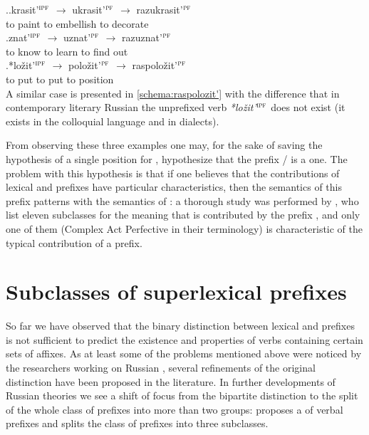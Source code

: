 \ex.\ag.\label{schema:razukrasit'}krasit'$^{\textsc{ipf}}$ {$\rightarrow$} ukrasit'$^{\textsc{pf}}$ {$\rightarrow$} razukrasit'$^{\textsc{pf}}$\\
{to paint} {} {to embellish} {} {to decorate}\\
\bg.\label{schema:razuznat'}znat'$^{\textsc{ipf}}$ {$\rightarrow$} uznat'$^{\textsc{pf}}$ {$\rightarrow$} razuznat'$^{\textsc{pf}}$\\
{to know} {} {to learn} {} {to find out}\\
\bg.*lo\v{z}it'$^{\textsc{ipf}}$ {$\rightarrow$} polo\v{z}it'$^{\textsc{pf}}$ {$\rightarrow$} raspolo\v{z}it'$^{\textsc{pf}}$\label{schema:raspolozit'}\\
{to put} {} {to put} {} {to position}\\

A similar case is presented in \ref{schema:raspolozit'}
with the difference that in contemporary literary Russian the unprefixed verb \textit{*lo\v{z}it'}$^{\textsc{ipf}}$ does not exist (it exists in the colloquial language and in dialects). 

From observing these three examples one may, for the sake of saving the hypothesis of a single position for , hypothesize that the prefix \mbox{/} is a  one. The problem with this hypothesis is that if one believes that the contributions of lexical and  prefixes have particular characteristics, then the semantics of this prefix patterns with the semantics of : a thorough study was performed by \citet{JandaNesset:10}, who list eleven subclasses for the meaning that is contributed by the prefix , and only one of them (Complex Act Perfective in their terminology) is characteristic of the typical contribution of a  prefix.


\section{Subclasses of superlexical prefixes}\label{section:subclasses}
So far we have observed that the binary distinction between lexical and  prefixes is not sufficient to predict the existence and properties of verbs containing certain sets of affixes. As at least some of the problems mentioned above were noticed by the researchers working on Russian , several refinements of the original distinction have been proposed in the literature. In further developments of Russian  theories we see a shift of focus from the bipartite distinction to the split of the whole class of prefixes into more than two groups: \citet{Tatevosov:07} proposes a  of verbal prefixes and \citet{Tatevosov:09} splits the class of  prefixes into three subclasses.

